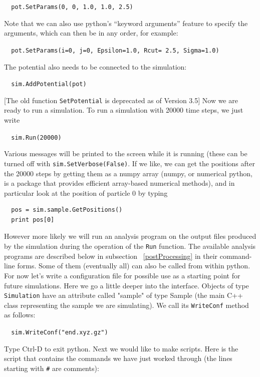 \verb|  pot.SetParams(0, 0, 1.0, 1.0, 2.5)|

Note that we can also use python's ``keyword arguments'' feature to specify the
arguments, which can then be in any order, for example:

\verb|  pot.SetParams(i=0, j=0, Epsilon=1.0, Rcut= 2.5, Sigma=1.0)|

The potential also needs to be connected to the simulation:

\verb|  sim.AddPotential(pot)|

[The old function \verb|SetPotential| is deprecated as of Version 3.5] Now we are ready to run a simulation. To run a simulation with 20000 time steps,
we just write

\verb|  sim.Run(20000)|

Various messages will be printed to the screen while it is running (these can
 be turned off with \verb|sim.SetVerbose(False)|. If we like, we
can get the positions after the 20000 steps by getting them as a numpy array 
(numpy, or numerical python, is a package that provides efficient array-based
numerical methods), and in particular look at the position of particle 0 by typing

\begin{verbatim}
  pos = sim.sample.GetPositions()
  print pos[0]
\end{verbatim}

However more likely we will run an analysis program on the output
files produced by the simulation during the operation of the \verb|Run|
function. The available analysis programs are described below in subsection~ 
\ref{postProcessing} in their command-line forms. Some of them (eventually all)
can also be called from within python. 
For now let's write a configuration file for possible use as a starting point
for future simulations. Here we go a little deeper into the interface.
Objects of type \verb|Simulation| have an attribute
called "sample" of type Sample 
(the main C++ class representing the sample we are simulating). We call its
\verb|WriteConf| method as follows:

\verb|  sim.WriteConf("end.xyz.gz")|


Type Ctrl-D to exit python. Next we would like to make scripts. Here is the 
script that contains the 
commands we have just worked through (the lines starting with \verb|#|
are comments):



